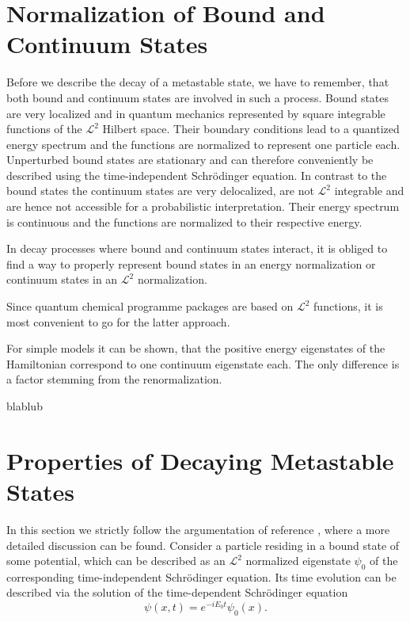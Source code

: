 \section{Normalization of Bound and Continuum States}
Before we describe the decay of a metastable state, we have to remember,
that both bound and continuum states are involved in such a process.
Bound states are very localized and in quantum mechanics
represented by square integrable
functions of the $\mathcal{L}^2$ Hilbert space. Their boundary conditions
lead to a quantized energy spectrum and the functions are normalized
to represent one particle each. Unperturbed bound states are stationary
and can therefore conveniently be described using the time-independent
Schrödinger equation.
In contrast to the bound states the
continuum states are very delocalized, are not $\mathcal{L}^2$
integrable and are hence not accessible for a probabilistic interpretation.
Their energy spectrum is continuous and the functions are normalized to
their respective energy.

In decay processes
where bound and continuum states interact, it is obliged to find a way to
properly represent bound states in an energy normalization or continuum states
in an $\mathcal{L}^2$ normalization.

Since quantum chemical programme packages are based on $\mathcal{L}^2$ functions,
it is most convenient to go for the latter approach.

For simple models it can be shown, that the positive energy eigenstates
of the Hamiltonian correspond to one continuum eigenstate each. The only
difference is a factor stemming from the renormalization.

blablub





\section{Properties of Decaying Metastable States}
In this section we strictly follow the argumentation of reference
\cite{xyz}, where a more detailed discussion can be found.
Consider a particle residing in a bound state of some potential, which
can be described as an $\mathcal{L}^2$ normalized eigenstate $\psi_0$
of the corresponding time-independent
Schrödinger equation. Its time evolution can be described via
the solution of the time-dependent Schrödinger equation
\begin{equation}
  \psi(x,t) = e^{-iE_0t} \psi_0(x) .
\end{equation}

